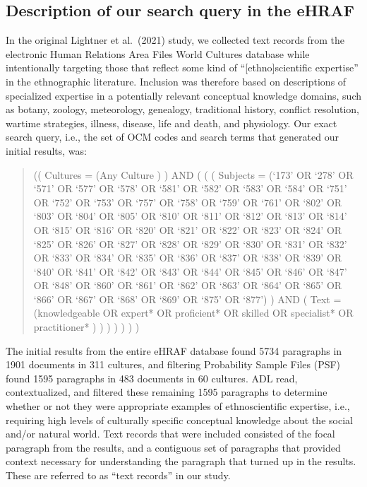 \documentclass[
]{article}
\begin{document}
\hypertarget{description-of-our-search-query-in-the-ehraf}{%
\subsection{Description of our search query in the eHRAF}\label{description-of-our-search-query-in-the-ehraf}}

In the original Lightner et al.~(2021) study, we collected text records from the electronic Human Relations Area Files World Cultures database while intentionally targeting those that reflect some kind of ``{[}ethno{]}scientific expertise'' in the ethnographic literature. Inclusion was therefore based on descriptions of specialized expertise in a potentially relevant conceptual knowledge domains, such as botany, zoology, meteorology, genealogy, traditional history, conflict resolution, wartime strategies, illness, disease, life and death, and physiology. Our exact search query, i.e., the set of OCM codes and search terms that generated our initial results, was:

\begin{quote}
(( Cultures = (Any Culture ) ) AND ( ( ( Subjects = (`173' OR `278' OR `571' OR `577' OR `578' OR `581' OR `582' OR `583' OR `584' OR `751' OR `752' OR `753' OR `757' OR `758' OR `759' OR `761' OR `802' OR `803' OR `804' OR `805' OR `810' OR `811' OR `812' OR `813' OR `814' OR `815' OR `816' OR `820' OR `821' OR `822' OR `823' OR `824' OR `825' OR `826' OR `827' OR `828' OR `829' OR `830' OR `831' OR `832' OR `833' OR `834' OR `835' OR `836' OR `837' OR `838' OR `839' OR `840' OR `841' OR `842' OR `843' OR `844' OR `845' OR `846' OR `847' OR `848' OR `860' OR `861' OR `862' OR `863' OR `864' OR `865' OR `866' OR `867' OR `868' OR `869' OR `875' OR `877') ) AND ( Text = (knowledgeable OR expert* OR proficient* OR skilled OR specialist* OR practitioner* ) ) ) ) ) ) )
\end{quote}

The initial results from the entire eHRAF database found 5734 paragraphs in 1901 documents in 311 cultures, and filtering Probability Sample Files (PSF) found 1595 paragraphs in 483 documents in 60 cultures. ADL read, contextualized, and filtered these remaining 1595 paragraphs to determine whether or not they were appropriate examples of ethnoscientific expertise, i.e., requiring high levels of culturally specific conceptual knowledge about the social and/or natural world. Text records that were included consisted of the focal paragraph from the results, and a contiguous set of paragraphs that provided context necessary for understanding the paragraph that turned up in the results. These are referred to as ``text records'' in our study.
\end{document}
